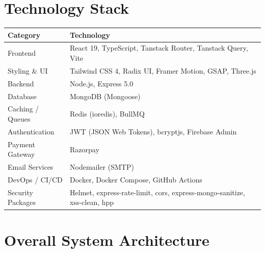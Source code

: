 \documentclass[11pt,a4paper]{article}
\begin{document}
\section{Technology Stack}
\begin{longtable}{@{}p{4.5cm}p{10cm}@{}}
    \toprule
    \textbf{Category} & \textbf{Technology} \\
    \midrule
    \endhead
    Frontend            & React 19, TypeScript, Tanstack Router, Tanstack Query, Vite \\
    Styling \& UI       & Tailwind CSS 4, Radix UI, Framer Motion, GSAP, Three.js \\
    Backend             & Node.js, Express 5.0 \\
    Database            & MongoDB (Mongoose) \\
    Caching / Queues    & Redis (ioredis), BullMQ \\
    Authentication      & JWT (JSON Web Tokens), bcryptjs, Firebase Admin \\
    Payment Gateway     & Razorpay \\
    Email Services      & Nodemailer (SMTP) \\
    DevOps / CI/CD      & Docker, Docker Compose, GitHub Actions \\
    Security Packages   & Helmet, express-rate-limit, cors, express-mongo-sanitize, xss-clean, hpp \\
    \bottomrule
\end{longtable}

\section{Overall System Architecture}
\end{document}
